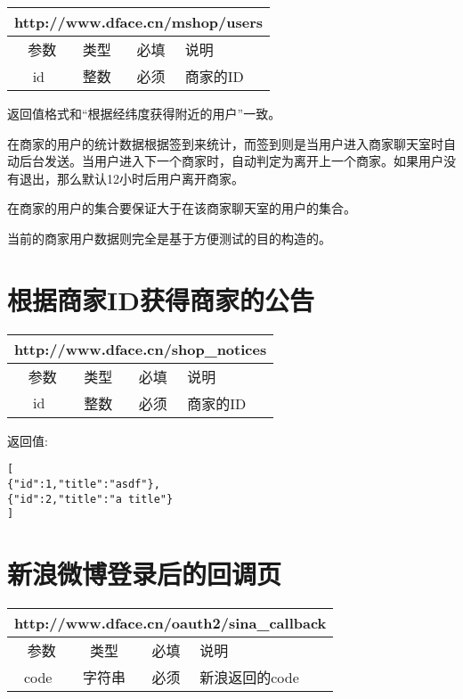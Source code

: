 \documentclass[cs4size]{ctexartutf8}
\begin{document}
\begin{table}[H]
   \begin{center}
\begin{tabular}{|c|c|c|p{12cm}|}
\hline
\multicolumn{4}{|c|}{http://www.dface.cn/mshop/users} \\
\hline\hline
 \  参数  & 类型 & 必填 &  说明  \\
\hline
 id  & 整数 & 必须 & 商家的ID\\
\hline
\end{tabular}
   \end{center}
\end{table}

返回值格式和“根据经纬度获得附近的用户”一致。

在商家的用户的统计数据根据签到来统计，而签到则是当用户进入商家聊天室时自动后台发送。当用户进入下一个商家时，自动判定为离开上一个商家。如果用户没有退出，那么默认12小时后用户离开商家。

在商家的用户的集合要保证大于在该商家聊天室的用户的集合。

当前的商家用户数据则完全是基于方便测试的目的构造的。



\section{根据商家ID获得商家的公告}

\begin{table}[H]
   \begin{center}
\begin{tabular}{|c|c|c|p{12cm}|}
\hline
\multicolumn{4}{|c|}{http://www.dface.cn/shop\_notices} \\
\hline\hline
 \  参数  & 类型 & 必填 &  说明  \\
\hline
 id  & 整数 & 必须 & 商家的ID\\
\hline
\end{tabular}
   \end{center}
\end{table}

返回值:
\begin{verbatim}
[
{"id":1,"title":"asdf"},
{"id":2,"title":"a title"}
]
\end{verbatim}

\section{新浪微博登录后的回调页}

\begin{table}[H]
   \begin{center}
\begin{tabular}{|c|c|c|p{12cm}|}
\hline
\multicolumn{4}{|c|}{http://www.dface.cn/oauth2/sina\_callback} \\
\hline\hline
 \  参数  & 类型 & 必填 &  说明  \\
\hline
 code  & 字符串 & 必须 &  新浪返回的code\\
\hline
\end{tabular}
   \end{center}
\end{table}
\end{document}
